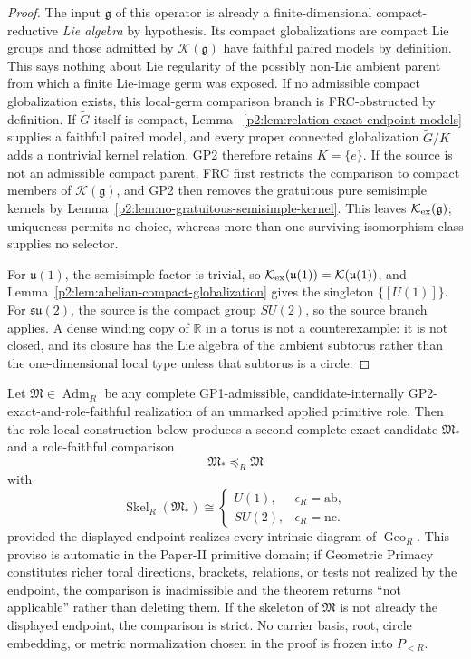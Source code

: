 \documentclass[12pt,a4paper]{article}
\begin{document}
\begin{proof}
The input \(\mathfrak g\) of this operator is already a
finite-dimensional compact-reductive \emph{Lie algebra} by hypothesis.
Its compact globalizations are compact Lie groups and those admitted by
\(\mathcal K(\mathfrak g)\) have faithful paired models by definition.
This says nothing about Lie regularity of the possibly non-Lie ambient
parent from which a finite Lie-image germ was exposed.
If no admissible compact globalization exists, this local-germ comparison
branch is FRC-obstructed by definition.
If \(\widetilde G\) itself is compact, Lemma~
\ref{p2:lem:relation-exact-endpoint-models} supplies a faithful paired model,
and every proper connected globalization \(\widetilde G/K\) adds a nontrivial
kernel relation.  GP2 therefore retains \(K=\{e\}\).  If the source is not an
admissible compact parent, FRC first restricts the comparison to compact
members of \(\mathcal K(\mathfrak g)\), and GP2 then removes the gratuitous
pure semisimple kernels by
Lemma~\ref{p2:lem:no-gratuitous-semisimple-kernel}.  This leaves
\(\mathcal K_{\rm ex}(\mathfrak g)\); uniqueness permits no choice, whereas
more than one surviving isomorphism class supplies no selector.

For \(\mathfrak u(1)\), the semisimple factor is trivial, so
\(\mathcal K_{\rm ex}(\mathfrak u(1))=\mathcal K(\mathfrak u(1))\), and
Lemma~\ref{p2:lem:abelian-compact-globalization} gives the singleton
\(\{[U(1)]\}\).  For \(\mathfrak{su}(2)\), the source is the compact group
\(SU(2)\), so the source branch applies.  A dense winding copy of \(\mathbb R\) in a torus is not a
counterexample: it is not closed, and its closure has the Lie algebra of the
ambient subtorus rather than the one-dimensional local type unless that
subtorus is a circle.
\end{proof}

\begin{theorem}
\label{p2:thm:primitive-endpoint-lift-reachability}
Let \(\mathfrak M\in\operatorname{Adm}_R\) be any complete
GP1-admissible, candidate-internally GP2-exact-and-role-faithful realization of
an unmarked applied primitive role.  Then the role-local construction below
produces a second complete exact candidate \(\mathfrak M_*\) and a
role-faithful comparison
\[
       \mathfrak M_*\preceq_R\mathfrak M
\]
with
\[
 \operatorname{Skel}_R(\mathfrak M_*)\cong
 \begin{cases}
 U(1),&\epsilon_R=\mathrm{ab},\\[2pt]
 SU(2),&\epsilon_R=\mathrm{nc}.
 \end{cases}
\]
provided the displayed endpoint realizes every intrinsic diagram of
\(\operatorname{Geo}_R\).  This proviso is automatic in the Paper-II primitive
domain; if Geometric Primacy constitutes richer toral directions, brackets,
relations, or tests not realized by the endpoint, the comparison is
inadmissible and the theorem returns ``not applicable'' rather than deleting
them.  If the skeleton of \(\mathfrak M\) is not already the displayed
endpoint, the comparison is strict.  No carrier basis, root, circle embedding,
or metric normalization chosen in the proof is frozen into \(P_{<R}\).
\end{theorem}
\end{document}
